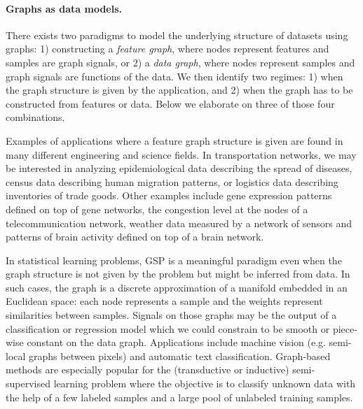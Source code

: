 \documentclass[a4paper]{scrartcl}
\begin{document}

\paragraph{Graphs as data models.}
There exists two paradigms to model the underlying structure of datasets using
graphs: 1) constructing a \textit{feature graph}, where nodes represent features
and samples are graph signals, or 2) a \textit{data graph}, where nodes
represent samples and graph signals are functions of the data. We then identify
two regimes: 1) when the graph structure is given by the application, and 2)
when the graph has to be constructed from features or data. Below we elaborate
on three of those four combinations.

Examples of applications where a feature graph structure is given are found in
many different engineering and science fields. In transportation networks, we
may be interested in analyzing epidemiological data describing the spread of
diseases, census data describing human migration patterns, or logistics data
describing inventories of trade goods. Other examples include gene expression
patterns defined on top of gene networks, the congestion level at the nodes of a
telecommunication network, weather data measured by a network of sensors and
patterns of brain activity defined on top of a brain network.


In statistical learning problems, GSP is a meaningful paradigm even when the
graph structure is not given by the problem but might be inferred from data.  In
such cases, the graph is a discrete approximation of a manifold embedded in an
Euclidean space: each node represents a sample and the weights represent
similarities between samples. Signals on those graphs may be the output of a
classification or regression model which we could constrain to be smooth or
piece-wise constant on the data graph. Applications include machine vision (e.g.
semi-local graphs between pixels) and automatic text classification.
Graph-based methods are especially popular for the (transductive or inductive)
semi-supervised learning problem where the objective is to classify unknown data
with the help of a few labeled samples and a large pool of unlabeled training
samples.
\end{document}
